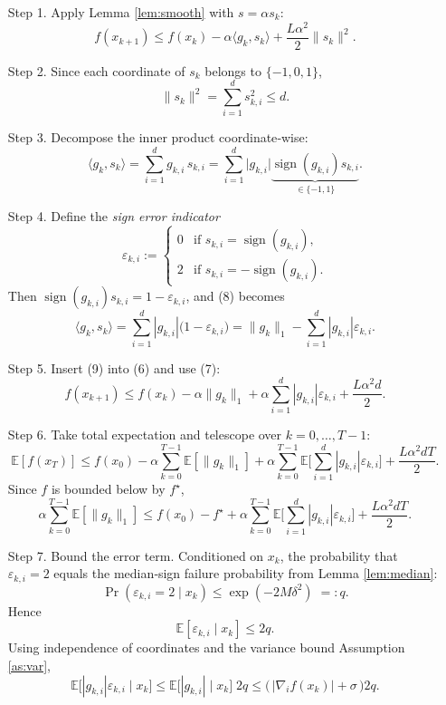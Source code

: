 \documentclass{article}
\newcommand{\sign}{\operatorname{sign}}
\newcommand{\E}{\mathbb{E}}
\begin{document}
\begin{enumerate}
\item[Step 1.] Apply Lemma \ref{lem:smooth} with $s=\alpha s_k$:
\[
f(x_{k+1})\le f(x_k)-\alpha\langle g_k,s_k\rangle
                +\frac{L\alpha^{2}}{2}\|s_k\|^{2}.
\tag{6}
\]
\item[Step 2.] Since each coordinate of $s_k$ belongs to $\{-1,0,1\}$,
\[
\|s_k\|^{2}= \sum_{i=1}^{d}s_{k,i}^{2}\le d .
\tag{7}
\]
\item[Step 3.] Decompose the inner product coordinate‑wise:
\[
\langle g_k,s_k\rangle
   =\sum_{i=1}^{d} g_{k,i}\,s_{k,i}
   =\sum_{i=1}^{d}\big|g_{k,i}\big|
      \underbrace{\sign(g_{k,i})s_{k,i}}_{\in\{-1,1\}} .
\tag{8}
\]
\item[Step 4.] Define the \emph{sign error indicator}
\[
\varepsilon_{k,i}:=
\begin{cases}
0 & \text{if }s_{k,i}= \sign(g_{k,i}),\\
2 & \text{if }s_{k,i}= -\sign(g_{k,i}).
\end{cases}
\]
Then $ \sign(g_{k,i})s_{k,i}=1-\varepsilon_{k,i}$, and (8) becomes
\[
\langle g_k,s_k\rangle
   =\sum_{i=1}^{d}|g_{k,i}| \big(1-\varepsilon_{k,i}\big)
   =\|g_k\|_{1}-\sum_{i=1}^{d}|g_{k,i}|\varepsilon_{k,i}.
\tag{9}
\]
\item[Step 5.] Insert (9) into (6) and use (7):
\[
f(x_{k+1})\le f(x_k)-\alpha\|g_k\|_{1}
   +\alpha\sum_{i=1}^{d}|g_{k,i}|\varepsilon_{k,i}
   +\frac{L\alpha^{2}d}{2}.
\tag{10}
\]
\item[Step 6.] Take total expectation and telescope over $k=0,\dots,T-1$:
\[
\E[f(x_T)]\le f(x_0)-\alpha\sum_{k=0}^{T-1}\E[\|g_k\|_{1}]
   +\alpha\sum_{k=0}^{T-1}\E\!\Big[\sum_{i=1}^{d}|g_{k,i}|\varepsilon_{k,i}\Big]
   +\frac{L\alpha^{2}dT}{2}.
\tag{11}
\]
Since $f$ is bounded below by $f^{\star}$,
\[
\alpha\sum_{k=0}^{T-1}\E[\|g_k\|_{1}]
\le f(x_0)-f^{\star}
   +\alpha\sum_{k=0}^{T-1}\E\!\Big[\sum_{i=1}^{d}|g_{k,i}|\varepsilon_{k,i}\Big]
   +\frac{L\alpha^{2}dT}{2}.
\tag{12}
\]
\item[Step 7.] Bound the error term.
Conditioned on $x_k$, the probability that $\varepsilon_{k,i}=2$ equals the
median‑sign failure probability from Lemma \ref{lem:median}:
\[
\Pr(\varepsilon_{k,i}=2\mid x_k)\le \exp(-2M\delta^{2})\;=:q.
\tag{13}
\]
Hence
\[
\E[\varepsilon_{k,i}\mid x_k]\le 2q.
\tag{14}
\]
Using independence of coordinates and the variance bound
Assumption \ref{as:var},
\[
\E\!\big[|g_{k,i}|\varepsilon_{k,i}\mid x_k\big]
\le \E\!\big[|g_{k,i}|\mid x_k\big]\;2q
\le \big(\,|\nabla_i f(x_k)|+ \sigma\,\big)2q .
\tag{15}
\]
\end{enumerate}
\end{document}
